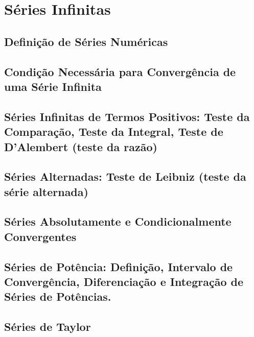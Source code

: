 
\section{Séries Infinitas}

\subsection{Definição de Séries Numéricas}
\subsection{Condição Necessária para Convergência de uma Série Infinita}
\subsection{Séries Infinitas de Termos Positivos: Teste da Comparação, Teste da Integral, Teste de D'Alembert (teste da razão)}
\subsection{Séries Alternadas: Teste de Leibniz (teste da série alternada)}
\subsection{Séries Absolutamente e Condicionalmente Convergentes}
\subsection{Séries de Potência: Definição, Intervalo de Convergência, Diferenciação e Integração de Séries de Potências.}
\subsection{Séries de Taylor}